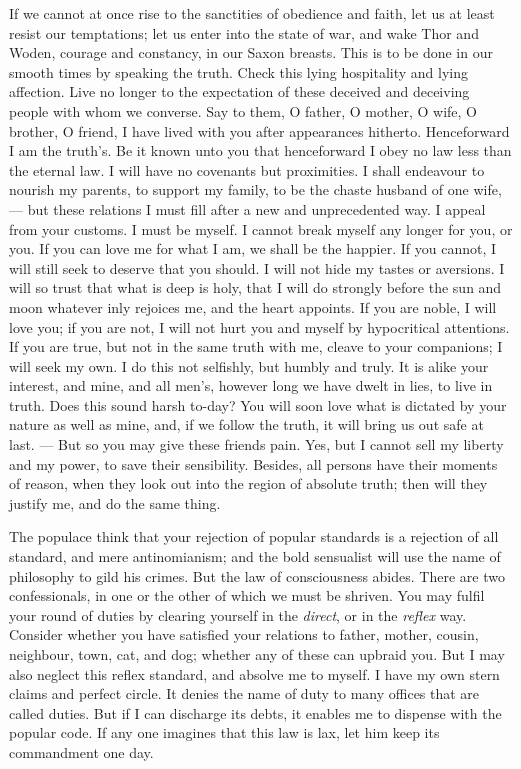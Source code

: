 \documentclass{article}
\begin{document}
If we cannot at once rise to the sanctities of obedience and faith, let us
at least resist our temptations; let us enter into the state of war, and
wake Thor and Woden, courage and constancy, in our Saxon breasts. This is to
be done in our smooth times by speaking the truth. Check this lying
hospitality and lying affection. Live no longer to the expectation of these
deceived and deceiving people with whom we converse. Say to them, O father,
O mother, O wife, O brother, O friend, I have lived with you after
appearances hitherto. Henceforward I am the truth's. Be it known unto you
that henceforward I obey no law less than the eternal law. I will have no
covenants but proximities. I shall endeavour to nourish my parents, to
support my family, to be the chaste husband of one wife, --- but these
relations I must fill after a new and unprecedented way. I appeal from your
customs. I must be myself. I cannot break myself any longer for you, or you.
If you can love me for what I am, we shall be the happier. If you cannot, I
will still seek to deserve that you should. I will not hide my tastes or
aversions. I will so trust that what is deep is holy, that I will do
strongly before the sun and moon whatever inly rejoices me, and the heart
appoints. If you are noble, I will love you; if you are not, I will not hurt
you and myself by hypocritical attentions. If you are true, but not in the
same truth with me, cleave to your companions; I will seek my own. I do this
not selfishly, but humbly and truly. It is alike your interest, and mine,
and all men's, however long we have dwelt in lies, to live in truth. Does
this sound harsh to-day? You will soon love what is dictated by your nature
as well as mine, and, if we follow the truth, it will bring us out safe at
last. --- But so you may give these friends pain. Yes, but I cannot sell my
liberty and my power, to save their sensibility. Besides, all persons have
their moments of reason, when they look out into the region of absolute
truth; then will they justify me, and do the same thing.

The populace think that your rejection of popular standards is a rejection
of all standard, and mere antinomianism; and the bold sensualist will use
the name of philosophy to gild his crimes. But the law of consciousness
abides. There are two confessionals, in one or the other of which we must be
shriven. You may fulfil your round of duties by clearing yourself in the
{\it direct}, or in the {\it reflex} way. Consider whether you
have satisfied your
relations to father, mother, cousin, neighbour, town, cat, and dog; whether
any of these can upbraid you. But I may also neglect this reflex standard,
and absolve me to myself. I have my own stern claims and perfect circle. It
denies the name of duty to many offices that are called duties. But if I can
discharge its debts, it enables me to dispense with the popular code. If any
one imagines that this law is lax, let him keep its commandment one day.
\end{document}
